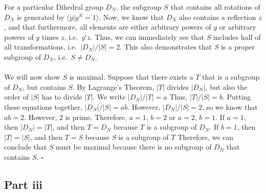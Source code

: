 \documentclass[letterpaper]{article}
\newcommand*{\QED}{\hfill\ensuremath{\square}}%
\begin{document}
For a particular Dihedral group $ D_N $, the subgroup $ S $ that contains all rotations of $ D_N $ is generated by $ \langle y | y^N = 1 \rangle $.
Now, we know that $ D_N $ also contains a reflection $ z $, and that furthermore, all elements are either arbitrary powers of $ y $ or arbitrary powers of $ y $ times $ z $, i.e.\ $ y^{i}z $.
Thus, we can immediately see that $ S $ includes half of all transformations, i.e.\ $ |D_N| / |S| = 2 $.
This also demonstrates that $ S $ is a proper subgroup of $ D_N $, i.e.\ $ S \neq D_N $.
\\ \\
We will now show $ S $ is maximal.
Suppose that there exists a $ T $ that is a subgroup of $ D_N $, but contains $ S $.
By Lagrange's Theorem, $ |T| $ divides $ |D_N| $, but also the order of $ |S| $ has to divide $ |T| $.
We write $ |D_N| / |T| = a $
Thus, $ |T| / |S| = b $.
Putting these equations together, $ |D_N| / |S| = ab $.
However, $ |D_N| / |S| = 2 $, so we know that $ ab = 2 $.
However, $ 2 $ is prime.
Therefore, $ a = 1, \, b = 2 $ or $ a = 2, \, b = 1 $.
If $ a = 1 $, then $ |D_N| = |T| $, and then $ T = D_N $ because $ T $ is a subgroup of $ D_N $.
If $ b = 1 $, then $ |T| = |S| $, and then $ T = S $ because $ S $ is a subgroup of $ T $
Therefore, we can conclude that $ S $ must be maximal because there is no subgroup of $ D_N $ that contains $ S $.
\QED{}

\subsection{Part iii}
\label{sub:6Partiii}
\end{document}
